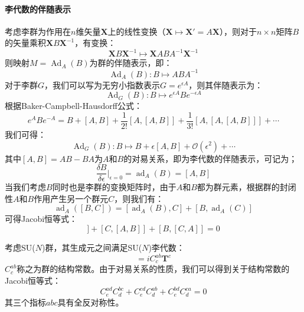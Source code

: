 \paragraph{李代数的伴随表示} 
考虑李群为作用在$n$维矢量$\boldsymbol{X}$上的线性变换（$\boldsymbol{X}\mapsto \boldsymbol{X}' = A \boldsymbol{X}$），则对于$n\times n$矩阵$B$的矢量乘积$\boldsymbol{X}B\boldsymbol{X}^{-1}$，有变换：
\begin{equation}
    \boldsymbol{X}B\boldsymbol{X}^{-1} \mapsto \boldsymbol{X} AB A^{-1}\boldsymbol{X}^{-1}
\end{equation}
则映射$M =\operatorname{Ad}_A (B)$为群的伴随表示，即：
\begin{equation}
    \operatorname{Ad}_A (B): B\mapsto ABA^{-1}
\end{equation}
对于李群$G$，我们可以写为无穷小指数表示$G=e^{\epsilon A}$，则其伴随表示为：
\begin{equation}
    \operatorname{Ad}_G (B): B\mapsto e^{\epsilon A} B e^{-\epsilon A}
\end{equation}
根据Baker-Campbell-Hausdorff公式：
\begin{equation}
    e^A B e^{-A}= B + [A,B]+\frac{1}{2!}[A,[A,B]]+\frac{1}{3!}[A,[A,[A,B]]]+\cdots
\end{equation}
我们可得：
\begin{equation}
    \operatorname{Ad}_G (B) : B\mapsto B + \epsilon [A, B] + \mathcal{O}(\epsilon^2)+\cdots
\end{equation}
其中$[A,B]=AB-BA$为$A$和$B$的对易关系，即为李代数的伴随表示，可记为；
\begin{equation}
    \frac{\delta B}{\delta \epsilon}\Big|_{\epsilon=0} = \operatorname{ad}_A(B) = [A,B]
\end{equation}
当我们考虑$B$同时也是李群的变换矩阵时，由于$A$和$B$都为群元素，根据群的封闭性$A$和$B$作用产生另一个群元$C$，则我们有：
\begin{equation}
    \operatorname{ad}_A([B,C]) = [\operatorname{ad}_A (B), C] + [B,\operatorname{ad}_A(C)]
\end{equation}
可得Jacobi恒等式：
\begin{equation}
    [A, [B,C]] + [C, [A,B]] + [B, [C,A]] = 0
\end{equation}

考虑SU($N$)群，其生成元之间满足SU($N$)李代数：
\begin{equation}
[\boldsymbol{T}^a,\boldsymbol{T}^b]=iC^{ab}_c\boldsymbol{T}^c
\end{equation}
$C^{ab}_c$称之为群的结构常数。由于对易关系的性质，我们可以得到关于结构常数的Jacobi恒等式：
\begin{equation}
C^{ad}_e C^{bc}_d + C^{cd}_e C^{ab}_d +C^{bd}_e C^{ca}_d=0
\end{equation}
其三个指标$abc$具有全反对称性。%

